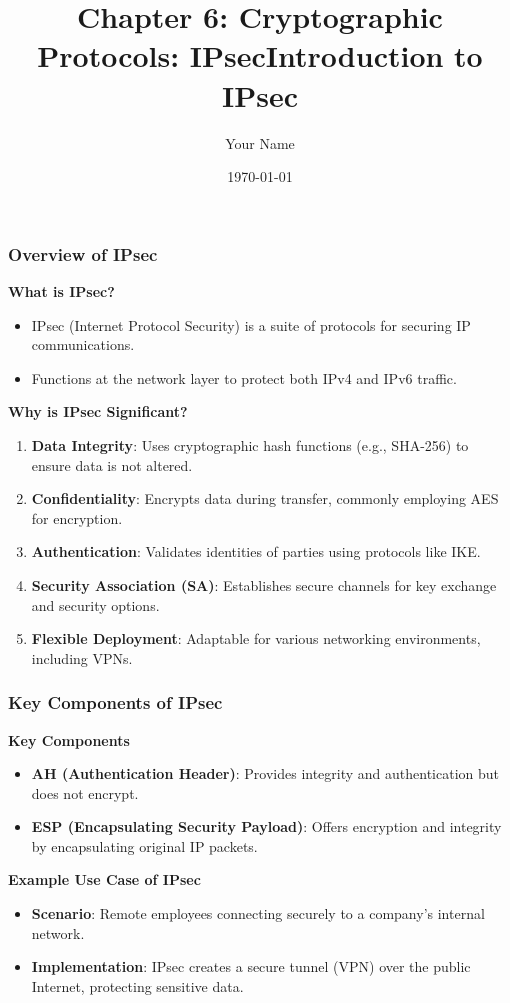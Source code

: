 \documentclass{beamer}
\title{Chapter 6: Cryptographic Protocols: IPsec}
\author{Your Name}
\institute{Your Institution}
\date{\today}
\begin{document}
\frame{\titlepage}

\begin{frame}[fragile]
    \title{Introduction to IPsec}
    \author{}
    \date{}
    \maketitle
\end{frame}

\begin{frame}[fragile]
    \frametitle{Overview of IPsec}
    
    \textbf{What is IPsec?}
    \begin{itemize}
        \item IPsec (Internet Protocol Security) is a suite of protocols for securing IP communications.
        \item Functions at the network layer to protect both IPv4 and IPv6 traffic.
    \end{itemize}
    
    \textbf{Why is IPsec Significant?}
    \begin{enumerate}
        \item \textbf{Data Integrity}: Uses cryptographic hash functions (e.g., SHA-256) to ensure data is not altered.
        \item \textbf{Confidentiality}: Encrypts data during transfer, commonly employing AES for encryption.
        \item \textbf{Authentication}: Validates identities of parties using protocols like IKE.
        \item \textbf{Security Association (SA)}: Establishes secure channels for key exchange and security options.
        \item \textbf{Flexible Deployment}: Adaptable for various networking environments, including VPNs.
    \end{enumerate}
\end{frame}

\begin{frame}[fragile]
    \frametitle{Key Components of IPsec}
    
    \textbf{Key Components}
    \begin{itemize}
        \item \textbf{AH (Authentication Header)}: Provides integrity and authentication but does not encrypt.
        \item \textbf{ESP (Encapsulating Security Payload)}: Offers encryption and integrity by encapsulating original IP packets.
    \end{itemize}
    
    \textbf{Example Use Case of IPsec}
    \begin{itemize}
        \item \textbf{Scenario}: Remote employees connecting securely to a company's internal network.
        \item \textbf{Implementation}: IPsec creates a secure tunnel (VPN) over the public Internet, protecting sensitive data.
    \end{itemize}
\end{frame}
\end{document}
